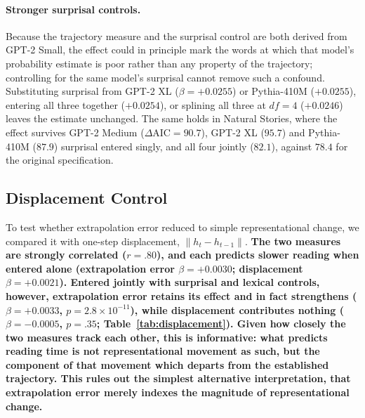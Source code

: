 \documentclass[12pt]{article}
\newcommand{\new}[1]{{\bfseries #1}}
\begin{document}
{\paragraph{Stronger surprisal controls.} Because the trajectory measure and the surprisal control are both derived from GPT-2 Small, the effect could in principle mark the words at which that model's probability estimate is poor rather than any property of the trajectory; controlling for the same model's surprisal cannot remove such a confound. Substituting surprisal from GPT-2 XL ($\beta = +0.0255$) or Pythia-410M ($+0.0255$), entering all three together ($+0.0254$), or splining all three at $df = 4$ ($+0.0246$) leaves the estimate unchanged. The same holds in Natural Stories, where the effect survives GPT-2 Medium ($\Delta\text{AIC} = 90.7$), GPT-2 XL ($95.7$) and Pythia-410M ($87.9$) surprisal entered singly, and all four jointly ($82.1$), against $78.4$ for the original specification.}

\subsection{Displacement Control}

To test whether extrapolation error reduced to simple representational change, we compared it with one-step displacement, $\|h_t - h_{t-1}\|$. \new{The two measures are strongly correlated ($r = .80$), and each predicts slower reading when entered alone (extrapolation error $\beta = +0.0030$; displacement $\beta = +0.0021$). Entered jointly with surprisal and lexical controls, however, extrapolation error retains its effect and in fact strengthens ($\beta = +0.0033$, $p = 2.8 \times 10^{-11}$), while displacement contributes nothing ($\beta = -0.0005$, $p = .35$; Table~\ref{tab:displacement}). Given how closely the two measures track each other, this is informative: what predicts reading time is not representational movement as such, but the component of that movement which departs from the established trajectory. This rules out the simplest alternative interpretation, that extrapolation error merely indexes the magnitude of representational change.}
\end{document}
